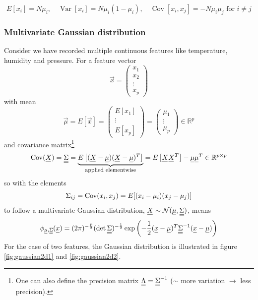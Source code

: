 \begin{equation}
    E[x_i] = N \mu_i, \quad \operatorname{Var}[x_i] = N \mu_i (1 - \mu_i), \quad \operatorname{Cov}[x_i, x_j] = -N \mu_i \mu_j \text{ for } i \neq j
\end{equation}

\subsubsection{Multivariate Gaussian distribution}
Consider we have recorded multiple continuous features like temperature, humidity and pressure.
For a feature vector
\begin{equation}
    \vec{x} = \left(\begin{array}{c}
        x_1 \\ x_2 \\ \vdots \\ x_p
    \end{array}\right)
\end{equation}
with mean
\begin{equation}
    \vec{\mu} = E[\vec{x}] = \left(\begin{array}{c}
        E[x_1] \\ \vdots \\ E[x_p]
    \end{array}\right) = \left(\begin{array}{c}
        \mu_1 \\ \vdots \\ \mu_p
    \end{array}\right) \in \mathbb{R}^p
\end{equation}
and covariance matrix\footnote{One can also define the precision matrix $\mat{\Lambda} = \mat{\Sigma}^{-1}$ ($\sim$ more variation $\rightarrow$ less precision).}
\begin{equation}
    \Cov(\vec{X}) = \mat{\Sigma} = \explain{E\left[ (\vec{X} - \vec{\mu}) (\vec{X} - \vec{\mu})^T \right]}{applied elementwise} = E\left[ \vec{X} \vec{X}^T \right] - \vec{\mu} \vec{\mu}^T \in \mathbb{R}^{p \times p}
\end{equation}
so with the elements
\begin{equation}
    \Sigma_{ij} = \operatorname{Cov}(x_i, x_j) = E[(x_i - \mu_i)(x_j - \mu_j)]
\end{equation}
to follow a multivariate Gaussian distribution, $\vec{X} \sim \mathcal{N}(\vec{\mu},\mat{\Sigma})$, means
\begin{equation}
    \phi_{\vec{\mu}, \mat{\Sigma}}(\vec{x})=(2 \pi)^{-\frac{p}{2}}(\operatorname{det} \mat{\Sigma})^{-\frac{1}{2}} \exp \left(-\frac{1}{2}(\vec{x}-\vec{\mu})^T \mat{\Sigma}^{-1}(\vec{x}-\vec{\mu})\right)
\end{equation}
For the case of two features, the Gaussian distribution is illustrated in figure \ref{fig:gaussian2d1} and \ref{fig:gaussian2d2}.

